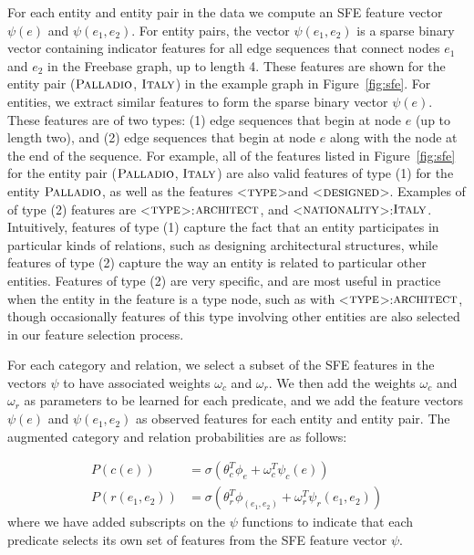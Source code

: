 \documentclass[11pt]{article}
\newcommand{\figref}[1]{Figure~\ref{fig:#1}}
\newcommand{\formalpredicate}[1]{\ensuremath{\textsc{#1}}}
\newcommand{\entity}[1]{\ensuremath{\textsc{#1}}}
\begin{document}
For each entity and entity pair in the data we compute an SFE feature vector
$\psi(e)$ and $\psi(e_1, e_2)$.  For entity pairs, the vector $\psi(e_1, e_2)$
is a sparse binary vector containing indicator features for all edge sequences
that connect nodes $e_1$ and $e_2$ in the Freebase graph, up to length 4.
These features are shown for the entity pair (\entity{Palladio},
\entity{Italy}) in the example graph in \figref{sfe}.  For entities, we extract
similar features to form the sparse binary vector $\psi(e)$.  These features
are of two types: (1) edge sequences that begin at node $e$ (up to length two),
and (2) edge sequences that begin at node $e$ along with the node at the end of
the sequence.  For example, all of the features listed in \figref{sfe} for the
entity pair (\entity{Palladio}, \entity{Italy}) are also valid features of type
(1) for the entity \entity{Palladio}, as well as the features
\textless\formalpredicate{type}\textgreater and
\textless\formalpredicate{designed}\textgreater.  Examples of of type (2) features
are \textless\formalpredicate{type}\textgreater:\entity{architect}, and
\textless\formalpredicate{nationality}\textgreater:\entity{Italy}.  Intuitively,
features of type (1) capture the fact that an entity participates in particular
kinds of relations, such as designing architectural structures, while features
of type (2) capture the way an entity is related to particular other entities.
Features of type (2) are very specific, and are most useful in practice when
the entity in the feature is a type node, such as with
\textless\formalpredicate{type}\textgreater:\entity{architect}, though occasionally
features of this type involving other entities are also selected in our feature
selection process.

For each category and relation, we select a subset of the SFE features in the
vectors $\psi$ to have associated weights $\omega_c$ and $\omega_r$.  We then
add the weights $\omega_c$ and $\omega_r$ as parameters to be learned for each
predicate, and we add the feature vectors $\psi(e)$ and $\psi(e_1, e_2)$ as
observed features for each entity and entity pair.  The augmented category and
relation probabilities are as follows:

\begin{align*}
  P(c(e)) &= \sigma ( \theta_c^T \phi_e + \omega_c^T \psi_c(e)) \\
  P(r(e_1, e_2)) &= \sigma ( \theta_r^T \phi_{(e_1, e_2)} + \omega_r^T \psi_r(e_1, e_2) )
\end{align*}
where we have added subscripts on the $\psi$ functions to indicate that each
predicate selects its own set of features from the SFE feature vector $\psi$.
\end{document}

